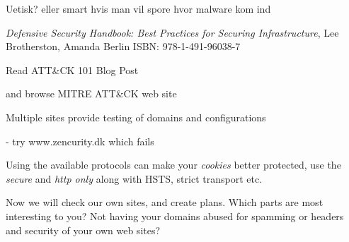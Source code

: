 \documentclass[Screen16to9,17pt]{foils}
\begin{document}
\centerline{Uetisk? eller smart hvis man vil spore hvor malware kom ind}



\myquestionspage




\emph{Defensive Security Handbook: Best Practices for Securing Infrastructure}, Lee Brotherston, Amanda Berlin ISBN: 978-1-491-96038-7


\begin{list1}
\item Read ATT\&CK 101 Blog Post\\
\item and browse MITRE ATT\&CK web site\\ 
\end{list1}



\begin{list1}
\item Multiple sites provide testing of domains and configurations
\item {}
\item {}
\item {} - try www.zencurity.dk which fails
\item {}
\item {}
\item {}
\item Using the available protocols can make your \emph{cookies} better protected, use the \emph{secure} and \emph{http only} along with HSTS, strict transport etc.
\end{list1}

Now we will check our own sites, and create plans. Which parts are most interesting to you? Not having your domains abused for spamming or headers and security of your own web sites?
\end{document}
